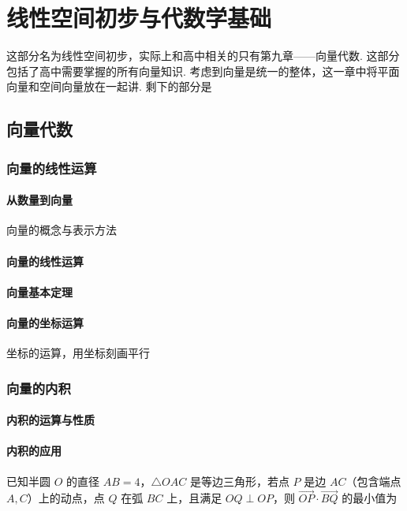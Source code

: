 \part{线性空间初步与代数学基础}

这部分名为线性空间初步，实际上和高中相关的只有第九章——向量代数. 这部分包括了高中需要掌握的所有向量知识. 
考虑到向量是统一的整体，这一章中将平面向量和空间向量放在一起讲. 剩下的部分是
\chapter{向量代数}

\clearpage

\section{向量的线性运算}
\subsection{从数量到向量}
向量的概念与表示方法
\clearpage
\subsection{向量的线性运算}

\clearpage
\subsection{向量基本定理}
\clearpage

\subsection{向量的坐标运算}

坐标的运算，用坐标刻画平行
\clearpage

\section{向量的内积}
\subsection{内积的运算与性质}
\clearpage
\subsection{内积的应用}

\begin{example}
    已知半圆 $O$ 的直径 $AB = 4$，$\triangle OAC$ 是等边三角形，若点 $P$ 是边 $AC$（包含端点 $A, C$）上的动点，点 $Q$ 在弧 $BC$ 上，且满足 $OQ \perp OP$，则 $\overrightarrow{OP} \cdot \overrightarrow{BQ}$ 的最小值为 
\end{example}

